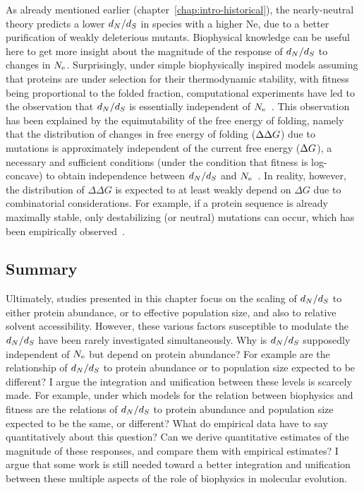 As already mentioned earlier (chapter~\ref{chap:intro-historical}), the nearly-neutral theory predicts a lower $d_N / d_S$ in species with a higher Ne, due to a better purification of weakly deleterious mutants.
Biophysical knowledge can be useful here to get more insight about the magnitude of the response of $d_N / d_S$ to changes in $N_{\textrm{e}}$.
Surprisingly, under simple biophysically inspired models assuming that proteins are under selection for their thermodynamic stability, with fitness being proportional to the folded fraction, computational experiments have led to the observation that $d_N / d_S$ is essentially independent of $N_{\textrm{e}}$~\citep{Goldstein2013}.
This observation has been explained by the equimutability of the free energy of folding, namely that the distribution of changes in free energy of folding ($\Delta \Delta G$) due to mutations is approximately independent of the current free energy ($\Delta G$), a necessary and sufficient conditions (under the condition that fitness is log-concave) to obtain independence between $d_N / d_S$ and $N_{\textrm{e}}$~\citep{Cherry1998}.
In reality, however, the distribution of $\Delta \Delta G$ is expected to at least weakly depend on $\Delta G$ due to combinatorial considerations.
For example, if a protein sequence is already maximally stable, only destabilizing (or neutral) mutations can occur, which has been empirically observed~\citep{Serohijos2012}.

\subsection{Summary}

Ultimately, studies presented in this chapter focus on the scaling of $d_N / d_S$ to either protein abundance, or to effective population size, and also to relative solvent accessibility.
However, these various factors susceptible to modulate the $d_N / d_S$ have been rarely investigated simultaneously.
Why is $d_N / d_S$ supposedly independent of $N_{\textrm{e}}$ but depend on protein abundance?
For example are the relationship of $d_N / d_S$ to protein abundance or to population size expected to be different?
I argue the integration and unification between these levels is scarcely made.
For example, under which models for the relation between biophysics and fitness are the relations of $d_N / d_S$ to protein abundance and population size expected to be the same, or different?
What do empirical data have to say quantitatively about this question?
Can we derive quantitative estimates of the magnitude of these responses, and compare them with empirical estimates?
I argue that some work is still needed toward a better integration and unification between these multiple aspects of the role of biophysics in molecular evolution.

